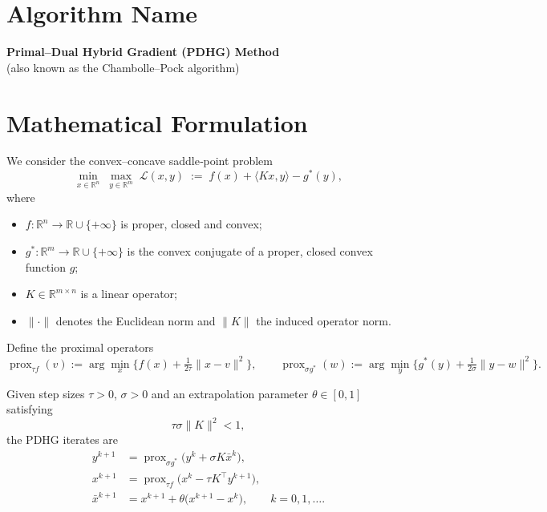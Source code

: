 \documentclass{article}
\newcommand{\prox}{\operatorname{prox}}
\begin{document}
\section*{Algorithm Name}
\begin{center}
\textbf{Primal–Dual Hybrid Gradient (PDHG) Method}\\
(also known as the Chambolle–Pock algorithm)
\end{center}

\section*{Mathematical Formulation}
We consider the convex–concave saddle‑point problem  
\[
\min_{x\in\mathbb R^{n}} \; \max_{y\in\mathbb R^{m}} 
\; \mathcal L(x,y)\;:=\; f(x)+\langle Kx , y\rangle-g^{*}(y),
\tag{1}
\]
where  

\begin{itemize}
\item $f:\mathbb R^{n}\!\to\!\mathbb R\cup\{+\infty\}$ is proper, closed and convex;
\item $g^{*}:\mathbb R^{m}\!\to\!\mathbb R\cup\{+\infty\}$ is the convex conjugate of a proper, closed convex function $g$;
\item $K\in\mathbb R^{m\times n}$ is a linear operator;
\item $\|\cdot\|$ denotes the Euclidean norm and $\|K\|$ the induced operator norm.
\end{itemize}

Define the proximal operators
\[
\prox_{\tau f}(v):=\arg\min_{x}\Big\{f(x)+\tfrac{1}{2\tau}\|x-v\|^{2}\Big\},
\qquad
\prox_{\sigma g^{*}}(w):=\arg\min_{y}\Big\{g^{*}(y)+\tfrac{1}{2\sigma}\|y-w\|^{2}\Big\}.
\]

Given step sizes $\tau>0$, $\sigma>0$ and an extrapolation parameter $\theta\in[0,1]$ satisfying  
\[
\tau\sigma\|K\|^{2}<1,
\tag{2}
\]
the PDHG iterates are
\[
\begin{aligned}
y^{k+1}&=\prox_{\sigma g^{*}}\!\big(y^{k}+\sigma K\bar x^{k}\big), \\
x^{k+1}&=\prox_{\tau f}\!\big(x^{k}-\tau K^{\top}y^{k+1}\big), \\
\bar x^{k+1}&=x^{k+1}+\theta\big(x^{k+1}-x^{k}\big),
\qquad k=0,1,\dots .
\end{aligned}
\tag{3}
\]
\end{document}
